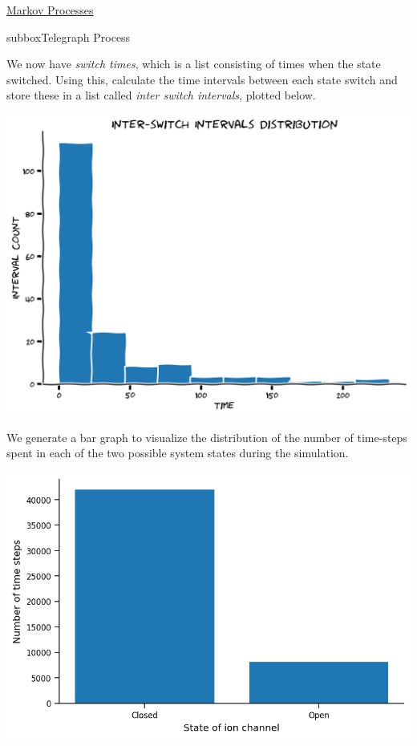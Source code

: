 \begin{textbox}{\href{https://colab.research.google.com/github/NeuromatchAcademy/course-content/blob/master/tutorials/W2D2_LinearSystems/student/W2D2_Tutorial2.ipynb}{Markov Processes } }
\begin{subbox}{subbox}{Telegraph Process}
\scriptsize

We now have \textit{switch times}, which is a list consisting of times when the state switched. Using this, calculate the time intervals between each state switch and store these in a list called \textit{inter switch intervals}, plotted below.

\begin{center}
    
\includegraphics[scale=0.2]{Figures/LS/MC_Figure2.png}
\end{center}

We generate a bar graph to visualize the distribution of the number of time-steps spent in each of the two possible system states during the simulation.
\begin{center}
\includegraphics[scale=0.25]{Figures/LS/MC_Figure3.png}
\end{center}


\end{subbox}
\end{textbox}
